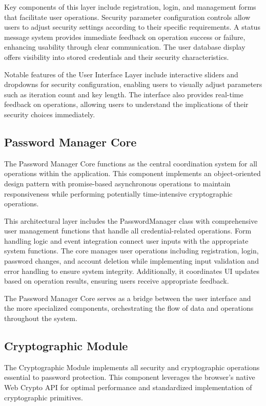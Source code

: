 \documentclass[11pt,a4paper]{article}
\begin{document}
Key components of this layer include registration, login, and management forms that facilitate user operations. Security parameter configuration controls allow users to adjust security settings according to their specific requirements. A status message system provides immediate feedback on operation success or failure, enhancing usability through clear communication. The user database display offers visibility into stored credentials and their security characteristics.

Notable features of the User Interface Layer include interactive sliders and dropdowns for security configuration, enabling users to visually adjust parameters such as iteration count and key length. The interface also provides real-time feedback on operations, allowing users to understand the implications of their security choices immediately.
\subsection{Password Manager Core}
The Password Manager Core functions as the central coordination system for all operations within the application. This component implements an object-oriented design pattern with promise-based asynchronous operations to maintain responsiveness while performing potentially time-intensive cryptographic operations.

This architectural layer includes the PasswordManager class with comprehensive user management functions that handle all credential-related operations. Form handling logic and event integration connect user inputs with the appropriate system functions. The core manages user operations including registration, login, password changes, and account deletion while implementing input validation and error handling to ensure system integrity. Additionally, it coordinates UI updates based on operation results, ensuring users receive appropriate feedback.

The Password Manager Core serves as a bridge between the user interface and the more specialized components, orchestrating the flow of data and operations throughout the system.
\subsection{Cryptographic Module}
The Cryptographic Module implements all security and cryptographic operations essential to password protection. This component leverages the browser's native Web Crypto API for optimal performance and standardized implementation of cryptographic primitives.
\end{document}
